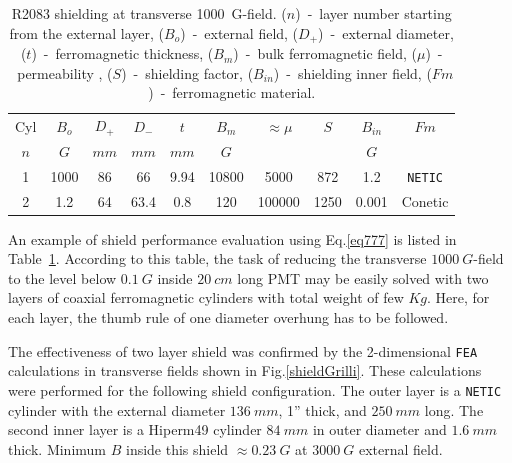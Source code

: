 \documentclass[12pt]{article}
\begin{document}
%
\begin{table}[htbp]
\begin{center}
\begin{tabular}{|c|c|c|c|c|c|c|c|c|c|} \hline
Cyl&$B_{o}$ & $D_+$ & $D_-$ & $t$ & $B_m$& $\approx\mu$&$S$      &$B_{in}$     & $Fm$   \\
$n$ &  $G$  & $mm$  & $mm$  & $mm$  & $G$ &           &         &$G$         &     \\ \hline
1    & 1000& 86  & 66  & 9.94 & 10800 & 5000       & 872  & 1.2    & {\tt NETIC}    \\ \hline
2    & 1.2 & 64  & 63.4& 0.8  &  120  & 100000     & 1250 & 0.001  & Conetic  \\ \hline 
\end{tabular}
\end{center}
\caption{\small{  R2083  shielding  at transverse 1000~G-field.
($n$)~-~layer number starting from the external layer,
($B_{o}$)~-~external field,
($D_+$)~-~external diameter,
($t$)~-~ferromagnetic thickness,
($B_m$)~-~bulk ferromagnetic field,
($\mu$)~-~permeability ,
($S$)~-~shielding factor,
($B_{in}$)~-~shielding inner field,
($Fm$)~-~ferromagnetic material.}
\label{ca001}}
\end{table}
%



An example  of shield performance  evaluation using Eq.\ref{eq777} is listed in Table~\ref{ca001}.
According to this table, the task of reducing the transverse  $1000~G$-field  to the 
level below  $0.1~G$ inside $20~cm$ long PMT may be easily  solved with two layers of  
coaxial ferromagnetic cylinders with total weight of 
few $Kg$. Here, for each layer, the thumb rule of one 
diameter overhung has to be followed.

The effectiveness of two layer shield was confirmed by the 2-dimensional  {\tt FEA}
calculations in transverse fields shown in Fig.\ref{shieldGrilli}. These calculations were performed
for the following shield configuration. The outer layer is a {\tt NETIC} cylinder with  
the external diameter $136~mm$,  1'' thick, and  
$250~mm$ long. The second inner layer is a Hiperm49 cylinder $84~mm$ in outer  diameter 
and $1.6~mm$ thick. 
Minimum $B$ inside this shield $\approx0.23~G$ at $3000~G$ external field.
\end{document}
